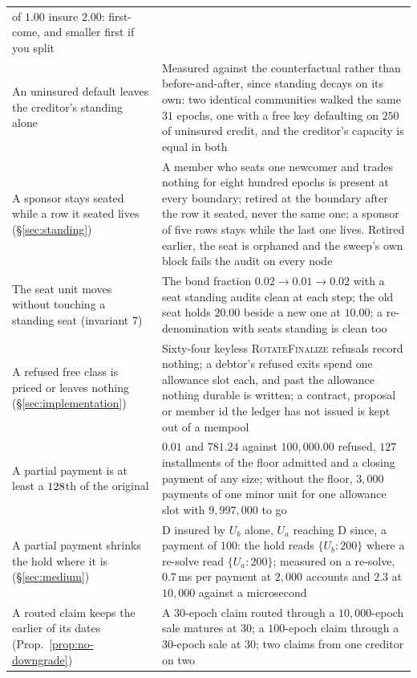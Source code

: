 \begin{longtable}{@{}p{}p{}@{}}
    of $1.00$ insure $2.00$: first-come, and smaller first if you split \\
An uninsured default leaves the creditor's standing alone
  & Measured against the counterfactual rather than before-and-after, since standing
    decays on its own: two identical communities walked the same $31$ epochs, one with a
    free key defaulting on $250$ of uninsured credit, and the creditor's capacity is
    equal in both \\
A sponsor stays seated while a row it seated lives (\S\ref{sec:standing})
  & A member who seats one newcomer and trades nothing for eight hundred epochs is present
    at every boundary; retired at the boundary after the row it seated, never the same one;
    a sponsor of five rows stays while the last one lives. Retired earlier, the seat is
    orphaned and the sweep's own block fails the audit on every node \\
The seat unit moves without touching a standing seat (invariant 7)
  & The bond fraction $0.02 \to 0.01 \to 0.02$ with a seat standing audits clean at each
    step; the old seat holds $20.00$ beside a new one at $10.00$; a re-denomination with
    seats standing is clean too \\
A refused free class is priced or leaves nothing (\S\ref{sec:implementation})
  & Sixty-four keyless \textsc{RotateFinalize} refusals record nothing; a debtor's refused
    exits spend one allowance slot each, and past the allowance nothing durable is written;
    a contract, proposal or member id the ledger has not issued is kept out of a mempool \\
A partial payment is at least a $128$th of the original
  & $0.01$ and $781.24$ against $100{,}000.00$ refused, $127$ installments of the floor
    admitted and a closing payment of any size; without the floor, $3{,}000$ payments of
    one minor unit for one allowance slot with $9{,}997{,}000$ to go \\
A partial payment shrinks the hold where it is (\S\ref{sec:medium})
  & D insured by $U_b$ alone, $U_a$ reaching D since, a payment of $100$: the hold reads
    $\{U_b: 200\}$ where a re-solve read $\{U_a: 200\}$; measured on a re-solve, $0.7$\,ms per
    payment at $2{,}000$ accounts and $2.3$ at $10{,}000$ against a microsecond \\
A routed claim keeps the earlier of its dates (Prop.~\ref{prop:no-downgrade})
  & A $30$-epoch claim routed through a $10{,}000$-epoch sale matures at $30$; a
    $100$-epoch claim through a $30$-epoch sale at $30$; two claims from one creditor on two

\end{longtable}
